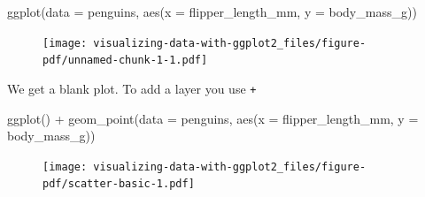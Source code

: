 \documentclass[
  letterpaper,
  DIV=11,
  numbers=noendperiod,
  oneside]{scrreprt}
\newenvironment{Shaded}{\begin{snugshade}}{\end{snugshade}}
\newcommand{\AttributeTok}[1]{\textcolor[rgb]{0.40,0.45,0.13}{#1}}
\newcommand{\FunctionTok}[1]{\textcolor[rgb]{0.28,0.35,0.67}{#1}}
\newcommand{\NormalTok}[1]{\textcolor[rgb]{0.00,0.23,0.31}{#1}}
\newcommand{\SpecialCharTok}[1]{\textcolor[rgb]{0.37,0.37,0.37}{#1}}
\begin{document}
\begin{Shaded}
\begin{Highlighting}[]
\FunctionTok{ggplot}\NormalTok{(}\AttributeTok{data =}\NormalTok{ penguins, }\FunctionTok{aes}\NormalTok{(}\AttributeTok{x =}\NormalTok{ flipper\_length\_mm, }\AttributeTok{y =}\NormalTok{ body\_mass\_g))}
\end{Highlighting}
\end{Shaded}

\begin{figure}[H]

{\centering \texttt{[image: visualizing-data-with-ggplot2\_files/figure-pdf/unnamed-chunk-1-1.pdf]}

}

\end{figure}

We get a blank plot. To add a layer you use \texttt{+}

\begin{Shaded}
\begin{Highlighting}[]
\FunctionTok{ggplot}\NormalTok{() }\SpecialCharTok{+}
  \FunctionTok{geom\_point}\NormalTok{(}\AttributeTok{data =}\NormalTok{ penguins,}
      \FunctionTok{aes}\NormalTok{(}\AttributeTok{x =}\NormalTok{ flipper\_length\_mm,}
          \AttributeTok{y =}\NormalTok{ body\_mass\_g))}
\end{Highlighting}
\end{Shaded}

\begin{figure}[H]

{\centering \texttt{[image: visualizing-data-with-ggplot2\_files/figure-pdf/scatter-basic-1.pdf]}

}

\end{figure}
\end{document}
